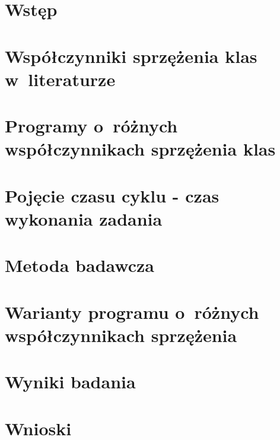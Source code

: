 \chapter{Wstęp}

\chapter{Współczynniki sprzężenia klas w~literaturze}

\chapter{Programy o~różnych współczynnikach sprzężenia klas}

\chapter{Pojęcie czasu cyklu - czas wykonania zadania}

\chapter{Metoda badawcza}

\chapter{Warianty programu o~różnych współczynnikach sprzężenia}

\chapter{Wyniki badania}

\chapter{Wnioski}
